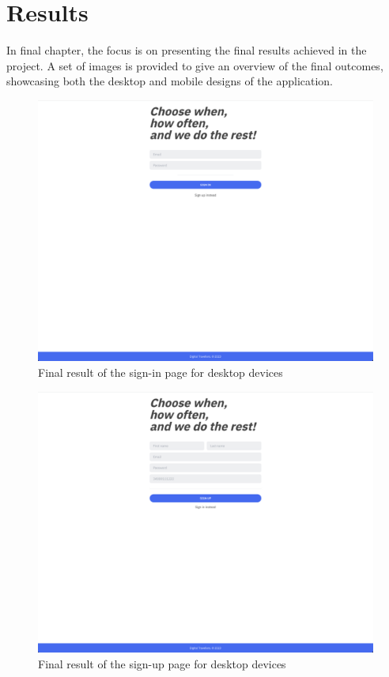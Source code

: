\documentclass[./memory.tex]{subfiles}
\begin{document}
\chapter{Results}
In final chapter, the focus is on presenting the final results achieved in the
project. A set of images is provided to give an overview of the final outcomes,
showcasing both the desktop and mobile designs of the application.
\begin{figure}[H]
	\centering
	\includegraphics[width=\textwidth]{./assets/results/desktop-sign-in.png}
	\caption{Final result of the sign-in page for desktop devices}
\end{figure}
\begin{figure}[H]
	\centering
	\includegraphics[width=\textwidth]{./assets/results/desktop-sign-up.png}
	\caption{Final result of the sign-up page for desktop devices}
\end{figure}
\end{document}
